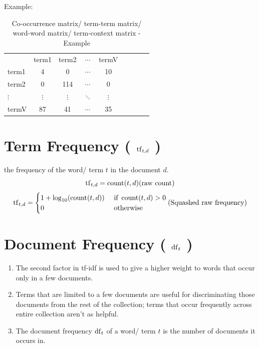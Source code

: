 Example:
\begin{table}[h]
    \centering
    \begin{tabular}{l c c c c c c c c}
         & term1 & term2 & $\cdots$ & termV \\
        term1 & 4 & 0 & $\cdots$ & 10 \\ 
        term2 & 0 & 114 & $\cdots$ & 0 \\ 
        $\vdots$ & $\vdots$ & $\vdots$ & $\ddots$ & $\vdots$ \\
        termV & 87 & 41 & $\cdots$ & 35 \\ 
    \end{tabular}
    \caption{Co-occurrence matrix/ term-term matrix/ word-word matrix/ term-context matrix - Example}
\end{table}

\section{Term Frequency ( $\operatorname{tf}_{t,d}$ ) \cite{nlp-1}} \label{Term Frequency}

the frequency of the word/ term $t$ in the document $d$.
\[
    \rcmdXtf_{t,d} = \rcmdXcount(t,d) \hfill \text{(raw count)}
\]
\[
    \rcmdXtf_{t,d} = \begin{cases}
        1 + \log_{10}(\rcmdXcount(t,d)) & \text{ if } \rcmdXcount(t,d) > 0\\
        0 & \text{ otherwise}
    \end{cases} \hfill \text{(Squashed raw frequency)}
\]


\section{Document Frequency ( $\operatorname{df}_t$ ) \cite{nlp-1}}\label{Document Frequency}

\begin{enumerate}
    \item The second factor in tf-idf is used to give a higher weight to words that occur only in a few documents.

    \item Terms that are limited to a few documents are useful for discriminating those documents from the rest of the collection; terms that occur frequently across entire collection aren't as helpful.

    \item The document frequency $\operatorname{df}_t$ of a word/ term $t$ is the number of documents it occurs in.
\end{enumerate}

